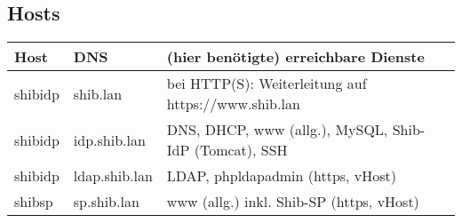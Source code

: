 \subsection{Hosts}
\begin{center}
	\begin{tabular}{| l | l | l | p{7cm} |}
		\hline
		Host & DNS & (hier benötigte) erreichbare Dienste \\ \hline\hline
		 shibidp & shib.lan & bei HTTP(S): Weiterleitung auf
		https://www.shib.lan \\ \hline
		shibidp & idp.shib.lan & DNS, DHCP, www
		(allg.), MySQL, Shib-IdP (Tomcat), SSH
		\\
		\hline 
		shibidp & ldap.shib.lan & LDAP, phpldapadmin (https,
		vHost)
		\\
		\hline  shibsp & sp.shib.lan & www (allg.) inkl. Shib-SP (https,
		vHost)
		\\
		\hline
		
	\end{tabular}
\end{center}